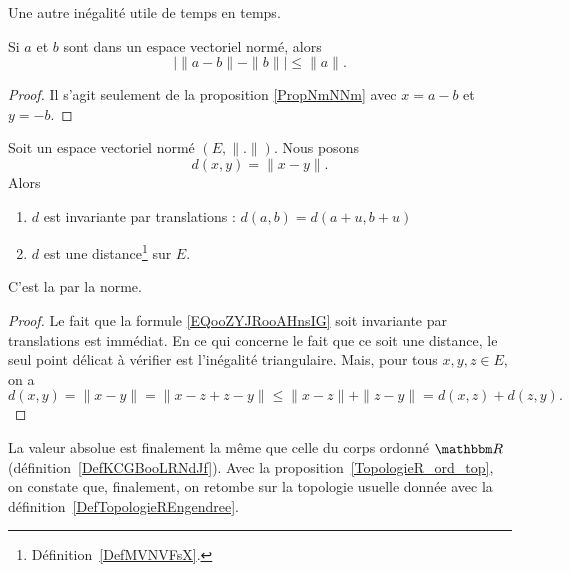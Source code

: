 Une autre inégalité utile de temps en temps.
\begin{corollary}       \label{CORooDFBGooAqVRfS}
    Si \( a\) et \( b\) sont dans un espace vectoriel normé, alors
    \begin{equation}
        \big| \| a-b \|-\| b \| \big|\leq \| a \|.
    \end{equation}
\end{corollary}

\begin{proof}
    Il s'agit seulement de la proposition \ref{PropNmNNm} avec \( x=a-b\) et \( y=-b\).
\end{proof}

\begin{lemmaDef}        \label{LEMooWGBJooYTDYIK}
    Soit un espace vectoriel normé \( (E,\| . \|)\). Nous posons
    \begin{equation}        \label{EQooZYJRooAHnsIG}
        d(x,y)=\| x-y \| .
    \end{equation}
    Alors
    \begin{enumerate}
        \item       \label{ITEMooLITDooPeReOk}
            \( d\) est invariante par translations : $d(a,b)=d(a+u,b+u)$
        \item
            \( d\) est une distance\footnote{Définition~\ref{DefMVNVFsX}.} sur \( E\).
    \end{enumerate}
    C'est la  par la norme.
\end{lemmaDef}

\begin{proof}
    Le fait que la formule \eqref{EQooZYJRooAHnsIG} soit invariante par translations est immédiat. En ce qui concerne le fait que ce soit une distance, le seul point délicat à vérifier est l'inégalité triangulaire. Mais, pour tous \( x, y, z \in E\), on a
    \begin{equation}
            d(x,y)=\| x-y \| = \| x-z+z-y \|  \leq\| x - z \|+\| z - y\| =d(x,z)+d(z,y).
    \end{equation}
\end{proof}

\begin{remark}
  La valeur absolue est finalement la même que celle du corps ordonné \( \eR \) (définition~\ref{DefKCGBooLRNdJf}). Avec la proposition~\ref{TopologieR_ord_top}, on constate que, finalement, on retombe sur la topologie usuelle donnée avec la définition~\ref{DefTopologieREngendree}.
\end{remark}

